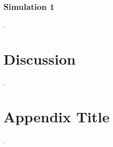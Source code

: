 \documentclass[grl]{agutex}
\begin{document}
\begin{article}
\subsubsection{Simulation 1}

.


\section{Discussion}

.





\appendix

\section{Appendix Title}

.


%
%
%


\end{article}
\end{document}
